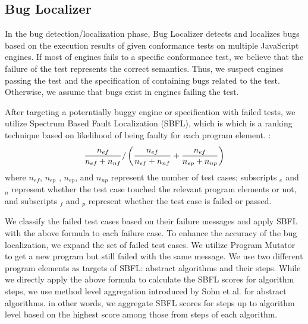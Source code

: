 \subsection{Bug Localizer}

In the bug detection/localization phase, \textsf{Bug Localizer} detects and
localizes bugs based on the execution results of given conformance tests on
multiple JavaScript engines.  If most of engines fails to a specific
conformance test, we believe that the failure of the test represents the
correct semantics.  Thus, we suspect engines passing the test and the
specification of containing bugs related to the test.  Otherwise, we assume
that bugs exist in engines failing the test.

After targeting a poterntially buggy engine or specification with failed tests,
we utilize Spectrum Based Fault Localization (SBFL)\cite{sbfl-survey}, which is
which is a ranking technique based on likelihood of being faulty for each
program element.  :
\[
  {{n_{ef}}\over{n_{ef} + n_{nf}}} /
  \left(
    {{n_{ef}}\over{n_{ef} + n_{nf}}} +
    {{n_{ef}}\over{n_{ep} + n_{np}}}
  \right)
\]
where $n_{ef}$, $n_{ep}$ , $n_{ep}$, and $n_{np}$ represent the number of test
cases; subscripts ${}_e$ and ${}_n$ represent whether the test case touched the
relevant program elements or not, and subscripts ${}_f$ and ${}_p$ represent
whether the test case is failed or passed.

We classify the failed test cases based on their failure messages and apply SBFL
with the above formula to each failure case.  To enhance the accuracy of the bug
localization, we expand the set of failed test cases.  We utilize
\textsf{Program Mutator} to get a new program but still failed with the same
message.  We use two different program elements as targets of SBFL: abstract
algorithms and their steps.  While we directly apply the above formula to
calculate the SBFL scores for algorithm steps, we use method level aggregation
introduced by Sohn et al.\cite{fluccs} for abstract algorithms.  in other
words, we aggregate SBFL scores for steps up to algorithm level based on the
highest score among those from steps of each algorithm.
